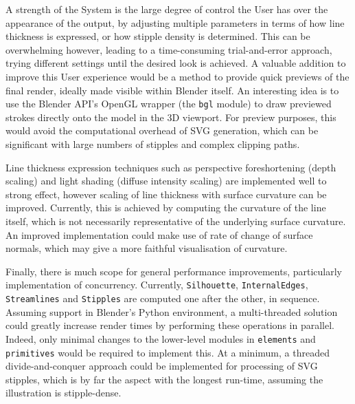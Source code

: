 A strength of the System is the large degree of control the User has over the appearance of the output, by adjusting multiple parameters in terms of how line thickness is expressed, or how stipple density is determined.
This can be overwhelming however, leading to a time-consuming trial-and-error approach, trying different settings until the desired look is achieved.
A valuable addition to improve this User experience would be a method to provide quick previews of the final render, ideally made visible within Blender itself.
An interesting idea is to use the Blender API's OpenGL wrapper (the \texttt{bgl} module) to draw previewed strokes directly onto the model in the 3D viewport.
For preview purposes, this would avoid the computational overhead of SVG generation, which can be significant with large numbers of stipples and complex clipping paths.

Line thickness expression techniques such as perspective foreshortening (depth scaling) and light shading (diffuse intensity scaling) are implemented well to strong effect, however scaling of line thickness with surface curvature can be improved.
Currently, this is achieved by computing the curvature of the line itself, which is not necessarily representative of the underlying surface curvature.
An improved implementation could make use of rate of change of surface normals, which may give a more faithful visualisation of curvature.

Finally, there is much scope for general performance improvements, particularly implementation of concurrency.
Currently, \texttt{Silhouette}, \texttt{InternalEdges}, \texttt{Streamlines} and \texttt{Stipples} are computed one after the other, in sequence.
Assuming support in Blender's Python environment, a multi-threaded solution could greatly increase render times by performing these operations in parallel.
Indeed, only minimal changes to the lower-level modules in \texttt{elements} and \texttt{primitives} would be required to implement this.
At a minimum, a threaded divide-and-conquer approach could be implemented for processing of SVG stipples, which is by far the aspect with the longest run-time, assuming the illustration is stipple-dense.